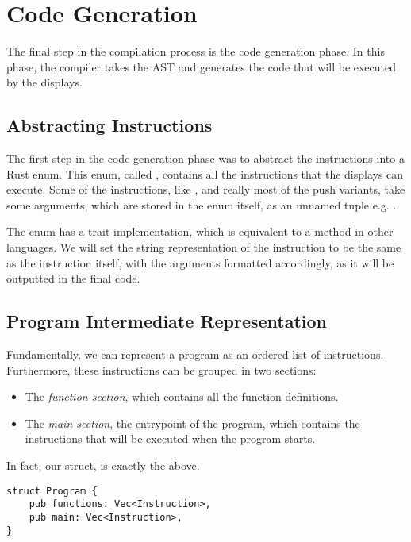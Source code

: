 \section{Code Generation}

The final step in the compilation process is the code generation phase. In this phase, the compiler takes the AST and generates the  code that will be executed by the  displays.

\subsection{Abstracting Instructions}

The first step in the code generation phase was to abstract the 
instructions into a Rust enum. This enum, called , contains
all the instructions that the  displays can execute. Some of the
instructions, like ,  and really most of the push
variants, take some arguments, which are stored in the enum itself, as an
unnamed tuple e.g. .

The  enum has a  trait implementation, which is
equivalent to a  method in other languages. We will set the
string representation of the instruction to be the same as the 
instruction itself, with the arguments formatted accordingly, as it will be
outputted in the final  code.

\subsection{Program Intermediate Representation}

Fundamentally, we can represent a  program as an ordered list of
instructions. Furthermore, these instructions can be grouped in two sections:
\begin{itemize}
    \item The \textit{function section}, which contains all the function definitions.
    \item The \textit{main section}, the entrypoint of the program, which
          contains the instructions that will be executed when the program starts.
\end{itemize}

In fact, our  struct, is exactly the above.

\begin{mainbox}{}
    \lstset{xleftmargin=.2\textwidth, aboveskip=0pt, belowskip=0pt}
    \begin{lstlisting}
struct Program {
    pub functions: Vec<Instruction>,
    pub main: Vec<Instruction>,
}
\end{lstlisting}
\end{mainbox}

